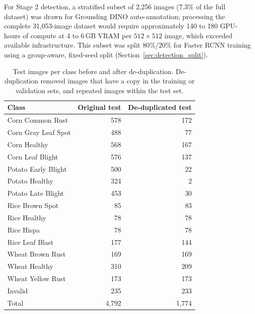For Stage 2 detection, a stratified subset of 2,256 images (7.3\% of the full dataset) was drawn for Grounding DINO auto-annotation; processing the complete 31,053-image dataset would require approximately 140 to 180 GPU-hours of compute at 4 to 6\,GB VRAM per $512\times512$ image, which exceeded available infrastructure. This subset was split 80\%/20\% for Faster RCNN training using a group-aware, fixed-seed split (Section~\ref{sec:detection_split}).
\begin{table}[!htbp]
\centering
\caption{Test images per class before and after de-duplication. De-duplication removed images that have a copy in the training or validation sets, and repeated images within the test set.}
\label{tab:clean-classes}
\small
\begin{tabular}{lrr}
\toprule
Class & Original test & De-duplicated test \\
\midrule
Corn Common Rust & 578 & 172 \\
Corn Gray Leaf Spot & 488 & 77 \\
Corn Healthy & 568 & 167 \\
Corn Leaf Blight & 576 & 137 \\
Potato Early Blight & 500 & 22 \\
Potato Healthy & 324 & 2 \\
Potato Late Blight & 453 & 30 \\
Rice Brown Spot & 85 & 83 \\
Rice Healthy & 78 & 78 \\
Rice Hispa & 78 & 78 \\
Rice Leaf Blast & 177 & 144 \\
Wheat Brown Rust & 169 & 169 \\
Wheat Healthy & 310 & 209 \\
Wheat Yellow Rust & 173 & 173 \\
Invalid & 235 & 233 \\
\midrule
Total & 4,792 & 1,774 \\
\bottomrule
\end{tabular}
\end{table}

